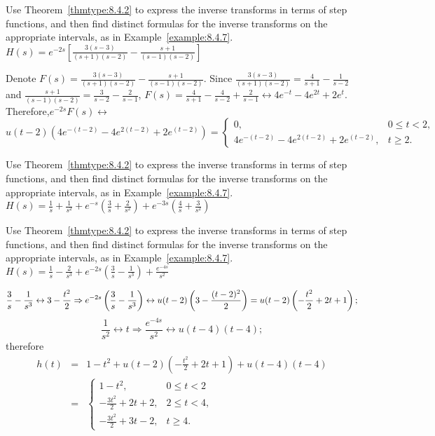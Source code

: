 \documentclass{ximera}
\begin{document}
\begin{problem}\label{exer:8.4.26} Use Theorem~\ref{thmtype:8.4.2} to express the inverse transforms in terms of step functions, and then find distinct formulas for the inverse transforms on the appropriate intervals, as in
Example~\ref{example:8.4.7}.  $H(s)= e^{-2s}\left[\frac{3(s-3)}{(s+1)(s-2)}-\frac{s+1}{(s-1)(s-2)}\right]$

\begin{solution}
Denote $F(s)=\frac{3(s-3)}{(s+1)(s-2)}-\frac{s+1}{(s-1)(s-2)}$.
Since $\frac{3(s-3)}{(s+1)(s-2)}=\frac{4}{s+1}-\frac{1}{s-2}$ and
$\frac{s+1}{(s-1)(s-2)}=\frac{3}{s-2}-\frac{2}{s-1}$,
  $F(s)=\frac{4}{s+1}-\frac{4}{s-2}+\frac{2}{s-1}
\leftrightarrow4e^{-t}-4e^{2t}+2e^t$.
Therefore,$e^{-2s}F(s)\leftrightarrow $
$u(t-2)\left
(4e^{-(t-2)}-4e^{2(t-2)}+2e^{(t-2)}\right)=
\left\{\begin{array}{cl} 0,&0\le
t<2,\\4e^{-(t-2)}-4e^{2(t-2)}+2e^{(t-2)},&t\ge
2.\end{array}\right.$
\end{solution}
\end{problem}

\begin{problem}\label{exer:8.4.27} Use Theorem~\ref{thmtype:8.4.2} to express the inverse transforms in terms of step functions, and then find distinct formulas for the inverse transforms on the appropriate intervals, as in
Example~\ref{example:8.4.7}.
$H(s)=\frac{1}{s}+\frac{1}{s^2}+e^{-s}\left(\frac{3}{s}+\frac{2}{s^2}\right) +e^{-3s}\left(\frac{4}{s}+\frac{3}{s^2}\right)$
\end{problem}

\begin{problem}\label{exer:8.4.28}
Use Theorem~\ref{thmtype:8.4.2} to express the inverse transforms in terms of step functions, and then find distinct formulas for the inverse transforms on the appropriate intervals, as in
Example~\ref{example:8.4.7}.
$H(s)=\frac{1}{s}-\frac{2}{s^3}+e^{-2s}\left(\frac{3}{s}-\frac{1}{s^3}\right) +\frac{e^{-4s}}{s^2}$

\begin{solution}
$$
\frac{3}{s}-\frac{1}{s^3}\leftrightarrow 3-{t^2\over2}\Rightarrow
e^{-2s}\left(\frac{3}{s}-\frac{1}{s^3}\right)\leftrightarrow
u(t-2)\left(3-\frac{(t-2)^2}{2}\right)=u(t-2)
\left(-\frac{t^2}{2}+2t+1\right);
$$
$$
\frac{1}{s^2}\leftrightarrow t\Rightarrow
\frac{e^{-4s}}{s^2}\leftrightarrow u(t-4)(t-4);
$$
therefore
\begin{eqnarray*}
h(t)&=&1-t^2+u(t-2)\left(-\frac{t^2}{2}+2t+1\right) +u(t-4)(t-4)
\\&=&
\left\{\begin{array}{cl} 1-t^2,&0\le
t<2\\ -\frac{3t^2}{2} +2t+2,&2\le
t<4,\\ -\frac{3t^2}{2}+3t-2,&t\ge 4.\end{array}\right.
\end{eqnarray*}
\end{solution}
\end{problem}
\end{document}

